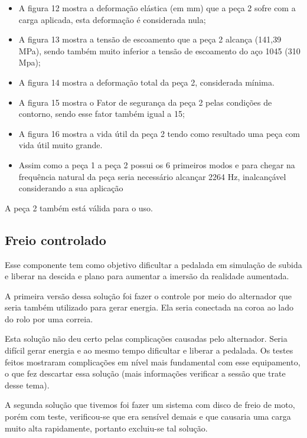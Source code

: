     \begin{itemize}
        \item A figura 12 mostra a deformação elástica (em mm) que a peça 2 sofre com a carga aplicada, esta deformação é considerada nula;
        \item A figura 13 mostra a tensão de escoamento que a peça 2 alcança (141,39 MPa), sendo também muito inferior a tensão de escoamento do aço 1045 (310 Mpa);
        \item A figura 14 mostra a deformação total da peça 2, considerada mínima.
        \item A figura 15 mostra o Fator de segurança da peça 2 pelas condições de contorno, sendo esse fator também igual a 15;
        \item A figura 16 mostra a vida útil da peça 2 tendo como resultado uma peça com vida útil muito grande.
        \item Assim como a peça 1 a peça 2 possui os 6 primeiros modos e para chegar na frequência natural da peça seria necessário alcançar 2264 Hz, inalcançável considerando a sua aplicação
    \end{itemize}

A peça 2 também está válida para o uso.

\subsection{Freio controlado} 
    Esse componente tem como objetivo dificultar a pedalada em simulação de subida e liberar na descida e plano para aumentar a imersão da realidade aumentada.

    A primeira versão dessa solução foi fazer o controle por meio do alternador que seria também utilizado para gerar energia. Ela seria conectada na coroa ao lado do rolo por uma correia.

    Esta solução não deu certo pelas complicações causadas pelo alternador. Seria difícil gerar energia e ao mesmo tempo dificultar e liberar a pedalada. Os testes feitos mostraram complicações em nível mais fundamental com esse equipamento, o que fez descartar essa solução (mais informações verificar a sessão que trate desse tema).

    A segunda solução que tivemos foi fazer um sistema com disco de freio de moto, porém com teste, verificou-se que era sensível demais e que causaria uma carga muito alta rapidamente, portanto excluiu-se tal solução.


